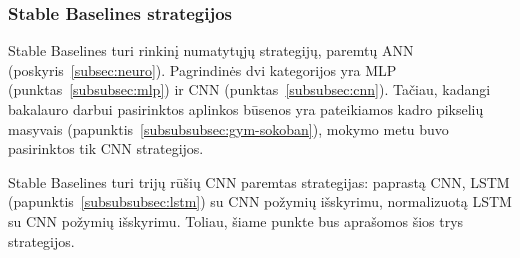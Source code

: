 \documentclass{VUMIFPSbakalaurinis}
\begin{document}
\subsubsection{Stable Baselines strategijos}\label{subsubsec:policies}
{
	Stable Baselines turi rinkinį numatytųjų strategijų, paremtų ANN (poskyris~\ref{subsec:neuro}). Pagrindinės dvi kategorijos yra MLP (punktas~\ref{subsubsec:mlp}) ir CNN (punktas~\ref{subsubsec:cnn}). Tačiau, kadangi bakalauro darbui pasirinktos aplinkos būsenos yra pateikiamos kadro pikselių masyvais (papunktis~\ref{subsubsubsec:gym-sokoban}), mokymo metu buvo pasirinktos tik CNN strategijos.\par
	
	Stable Baselines turi trijų rūšių CNN paremtas strategijas: paprastą CNN, LSTM (papunktis~\ref{subsubsubsec:lstm}) su CNN požymių išskyrimu, normalizuotą LSTM su CNN požymių išskyrimu. Toliau, šiame punkte bus aprašomos šios trys strategijos.
}
\label{subsubsubsec:cnnpolicy}
\end{document}
